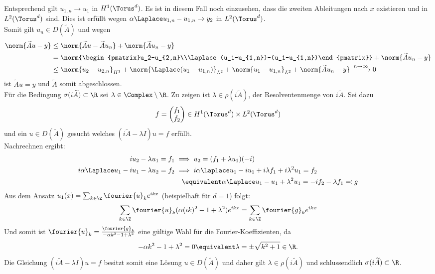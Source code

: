 Entsprechend gilt $u_{1,n}\to u_1$ in $H^1(\Torus^d)$. Es ist in diesem Fall noch einzusehen, dass die zweiten Ableitungen nach $x$ existieren und in $L^2(\Torus^d)$ sind. Dies ist erfüllt wegen $\alpha \Laplace u_{1,n}-u_{1,n}\to y_2$ in $L^2(\Torus^d)$.\\
Somit gilt $u_n\in D(\widetilde{A})$ und wegen 
\begin{align*}
\norm{\widetilde{A}u-y}&\le \norm{\widetilde{A}u-\widetilde{A}u_n}+\norm{\widetilde{A}u_n-y}\\
&=\norm{\begin{pmatrix}u_2-u_{2,n}\\\Laplace(u_1-u_{1,n})-(u_1-u_{1,n})\end{pmatrix}}+\norm{\widetilde{A}u_n-y}\\
&\le \norm{u_2-u_{2,n}}_{H^1}+\norm{\Laplace(u_1-u_{1,n})}_{L^2}+\norm{u_1-u_{1,n}}_{L^2}+\norm{\widetilde{A}u_n-y}\xrightarrow{n \to \infty }0
\end{align*}
ist $\widetilde{A}u=y$ und $\widetilde{A}$ somit abgeschlossen.\\
Für die Bedingung $\sigma(i\widetilde{A})\subset \R$ sei $\lambda \in\Complex\setminus\R$. Zu zeigen ist $\lambda \in\rho(i\widetilde{A})$, der Resolventenmenge von $i\widetilde{A}$. Sei dazu
\[f=\begin{pmatrix}f_1\\f_2\end{pmatrix}\in H^1(\Torus^d)\times L^2(\Torus^d)\]
und ein $u\in D(\widetilde{A})$ gesucht welches $(i\widetilde{A}-\lambda I)u=f$ erfüllt.\\
Nachrechnen ergibt:
\begin{align*}
iu_2-\lambda u_1=f_1 &\implies u_2=(f_1+\lambda u_1)(-i)\\
i\alpha \Laplace u_1-iu_1-\lambda u_2=f_2 &\implies i\alpha \Laplace u_1-iu_1+i\lambda f_1+i\lambda^2u_1=f_2\\
&\quad \equivalent \alpha \Laplace u_1-u_1+\lambda^2u_1=-if_2-\lambda f_1\eqqcolon g
\end{align*}
Aus dem Ansatz $u_1(x)=\sum_{k\in\Z}\fourier{u}_ke^{ikx}$ (beispielhaft für $d=1$) folgt:
\[\sum_{k\in\Z}\fourier{u}_k(\alpha (ik)^2-1+\lambda^2)e^{ikx}=\sum_{k\in\Z}\fourier{g}_ke^{ikx}\]
Und somit ist $\fourier{u}_k=\frac{\fourier{g}_k}{-\alpha k^2-1+\lambda^2}$ eine gültige Wahl für die Fourier-Koeffizienten, da 
\[-\alpha k^2-1+\lambda^2=0\equivalent \lambda =\pm \sqrt{k^2+1}\in\R.\]
Die Gleichung $(i\widetilde{A}-\lambda I)u=f$ besitzt somit eine Lösung $u\in D(\widetilde{A})$ und daher gilt $\lambda \in \rho(i\widetilde{A})$ und schlussendlich $\sigma(i\widetilde{A})\subset \R$.\\
